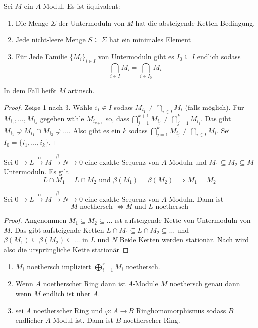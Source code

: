 \begin{Satz}
	Sei \(M\) ein \(A\)-Modul. Es ist äquivalent:
	\begin{enumerate}
		\item Die Menge \(\Sigma\) der Untermoduln von \(M\) hat die absteigende Ketten-Bedingung.
		\item Jede nicht-leere Menge \(S\subseteq \Sigma\) hat ein minimales Element
		\item Für Jede Familie \(\{M_i\}_{i\in I}\) von Untermoduln gibt es \(I_0\subseteq I\) endlich sodass \[\bigcap_{i\in I}M_i=\bigcap_{i\in I_0}M_i\]
	\end{enumerate}
	In dem Fall heißt \(M\) artinsch.
\end{Satz}
\begin{proof}
	Zeige 1 nach 3. Wähle \(i_1\in I\) sodass \(M_{i_1}\neq\bigcap_{i\in I}M_i\) (falls möglich). Für \(M_{i_1},\dots,M_{i_k}\) gegeben wähle \(M_{i_{k+1}}\) so, dass \(\bigcap_{j=1}^{k+1}M_{i_j}\neq \bigcap_{j=1}^kM_{i_j}\). Das gibt \(M_{i_1}\supsetneq M_{i_1}\cap M_{i_2}\supsetneq\dots\). Also gibt es ein \(k\) sodass \(\bigcap_{j=1}^{k}M_{i_j}\neq \bigcap_{i\in I}M_{i}\). Sei \(I_0=\{i_1,\dots,i_k\}.\)
\end{proof}
\begin{Lemma}\label{Lem:UntermodExSeq}
	Sei \(0\to L\stackrel{\alpha}\to M\stackrel \beta\to N\to 0\) eine exakte Sequenz von \(A\)-Moduln und \(M_1\subseteq M_2\subseteq M\) Untermoduln. Es gilt 
	\[L\cap M_1=L\cap M_2\text{ und }\beta(M_1)=\beta(M_2)\implies M_1=M_2\]
\end{Lemma}
\begin{Satz}
	Sei \(0\to L\stackrel{\alpha}\to M\stackrel \beta\to N\to 0\) eine exakte Sequenz von \(A\)-Moduln. Dann ist \[M \text{ noethersch } \iff M \text{ und } L \text{ noethersch}\]
\end{Satz}
\begin{proof}
	Angenommen \(M_1\subseteq M_2\subseteq \dots\) ist aufsteigende Kette von Untermoduln von \(M\). Das gibt aufsteigende Ketten
	\(L\cap M_1\subseteq L\cap M_2\subseteq \dots\) und
	\(\beta(M_1)\subseteq \beta(M_2)\subseteq \dots\) in \(L\) und \(N\) Beide Ketten werden stationär. Nach  wird also die ursprüngliche Kette stationär
\end{proof}
\begin{Kor}
	\begin{enumerate}
		\item \(M_i\) noethersch impliziert \(\bigoplus_{i=1}^rM_i\) noethersch.
		\item Wenn \(A\) noetherscher Ring dann ist \(A\)-Module \(M\) noethersch genau dann wenn \(M\) endlich ist über \(A\).
		\item sei \(A\) noetherscher Ring und \(\varphi\colon A\to B\) Ringhomomorphismus sodass \(B\) endlicher \(A\)-Modul ist. Dann ist \(B\) noetherscher Ring.
	\end{enumerate}
\end{Kor}
